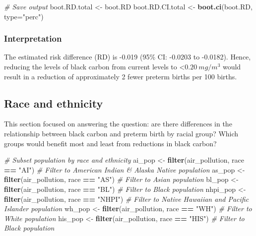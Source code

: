 \documentclass[
]{article}
\newenvironment{Shaded}{\begin{snugshade}}{\end{snugshade}}
\newcommand{\AttributeTok}[1]{\textcolor[rgb]{0.13,0.29,0.53}{#1}}
\newcommand{\CommentTok}[1]{\textcolor[rgb]{0.56,0.35,0.01}{\textit{#1}}}
\newcommand{\FunctionTok}[1]{\textcolor[rgb]{0.13,0.29,0.53}{\textbf{#1}}}
\newcommand{\NormalTok}[1]{#1}
\newcommand{\OtherTok}[1]{\textcolor[rgb]{0.56,0.35,0.01}{#1}}
\newcommand{\SpecialCharTok}[1]{\textcolor[rgb]{0.81,0.36,0.00}{\textbf{#1}}}
\newcommand{\StringTok}[1]{\textcolor[rgb]{0.31,0.60,0.02}{#1}}
\begin{document}
\begin{Shaded}
\begin{Highlighting}[]
\CommentTok{\# Save output}
\NormalTok{boot.RD.total }\OtherTok{\textless{}{-}}\NormalTok{ boot.RD}
\NormalTok{boot.RD.CI.total }\OtherTok{\textless{}{-}} \FunctionTok{boot.ci}\NormalTok{(boot.RD, }\AttributeTok{type=}\StringTok{"perc"}\NormalTok{) }
\end{Highlighting}
\end{Shaded}

\subsubsection{Interpretation}\label{interpretation}

The estimated risk difference (RD) is -0.019 (95\% CI: -0.0203 to
-0.0182). Hence, reducing the levels of black carbon from current levels
to \textless{}\(0.20 \ mg/m^3\) would result in a reduction of
approximately 2 fewer preterm births per 100 births.

\subsection{\texorpdfstring{\textbf{Race and
ethnicity}}{Race and ethnicity}}\label{race-and-ethnicity}

This section focused on answering the question: are there differences in
the relationship between black carbon and preterm birth by racial group?
Which groups would benefit most and least from reductions in black
carbon?

\begin{Shaded}
\begin{Highlighting}[]
\CommentTok{\# Subset population by race and ethnicity}
\NormalTok{ai\_pop }\OtherTok{\textless{}{-}} \FunctionTok{filter}\NormalTok{(air\_pollution, race }\SpecialCharTok{==} \StringTok{"AI"}\NormalTok{) }\CommentTok{\# Filter to American Indian \& Alaska Native population}
\NormalTok{as\_pop }\OtherTok{\textless{}{-}} \FunctionTok{filter}\NormalTok{(air\_pollution, race }\SpecialCharTok{==} \StringTok{"AS"}\NormalTok{) }\CommentTok{\# Filter to Asian population}
\NormalTok{bl\_pop }\OtherTok{\textless{}{-}} \FunctionTok{filter}\NormalTok{(air\_pollution, race }\SpecialCharTok{==} \StringTok{"BL"}\NormalTok{) }\CommentTok{\# Filter to Black population}
\NormalTok{nhpi\_pop }\OtherTok{\textless{}{-}} \FunctionTok{filter}\NormalTok{(air\_pollution, race }\SpecialCharTok{==} \StringTok{"NHPI"}\NormalTok{) }\CommentTok{\# Filter to Native Hawaiian and Pacific Islander population}
\NormalTok{wh\_pop }\OtherTok{\textless{}{-}} \FunctionTok{filter}\NormalTok{(air\_pollution, race }\SpecialCharTok{==} \StringTok{"WH"}\NormalTok{) }\CommentTok{\# Filter to White population}
\NormalTok{his\_pop }\OtherTok{\textless{}{-}} \FunctionTok{filter}\NormalTok{(air\_pollution, race }\SpecialCharTok{==} \StringTok{"HIS"}\NormalTok{) }\CommentTok{\# Filter to Black population}
\end{Highlighting}
\end{Shaded}
\end{document}
